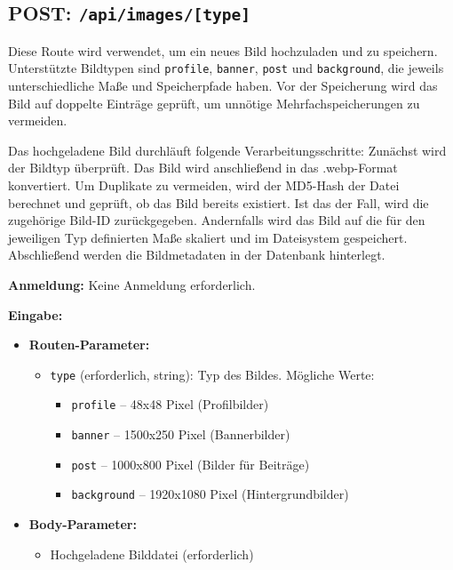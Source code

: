 \documentclass[a4paper,12pt]{article}
\begin{document}
\newpage
\subsection{POST: \texttt{/api/images/[type]}}

Diese Route wird verwendet, um ein neues Bild hochzuladen und zu speichern. Unterstützte Bildtypen sind \texttt{profile}, \texttt{banner}, \texttt{post} und \texttt{background}, die jeweils unterschiedliche Maße und Speicherpfade haben. Vor der Speicherung wird das Bild auf doppelte Einträge geprüft, um unnötige Mehrfachspeicherungen zu vermeiden.

Das hochgeladene Bild durchläuft folgende Verarbeitungsschritte: Zunächst wird der Bildtyp überprüft. Das Bild wird anschließend in das .webp-Format konvertiert. Um Duplikate zu vermeiden, wird der MD5-Hash der Datei berechnet und geprüft, ob das Bild bereits existiert. Ist das der Fall, wird die zugehörige Bild-ID zurückgegeben. Andernfalls wird das Bild auf die für den jeweiligen Typ definierten Maße skaliert und im Dateisystem gespeichert. Abschließend werden die Bildmetadaten in der Datenbank hinterlegt.

\textbf{Anmeldung:} Keine Anmeldung erforderlich.

\textbf{Eingabe:}
\begin{itemize}
    \item \textbf{Routen-Parameter:}
    \begin{itemize}
        \item \texttt{type} (erforderlich, string): Typ des Bildes. Mögliche Werte:
        \begin{itemize}
            \item \texttt{profile} – 48x48 Pixel (Profilbilder)
            \item \texttt{banner} – 1500x250 Pixel (Bannerbilder)
            \item \texttt{post} – 1000x800 Pixel (Bilder für Beiträge)
            \item \texttt{background} – 1920x1080 Pixel (Hintergrundbilder)
        \end{itemize}
    \end{itemize}
    \item \textbf{Body-Parameter:}
    \begin{itemize}
        \item Hochgeladene Bilddatei (erforderlich)
    \end{itemize}
\end{itemize}
\end{document}
